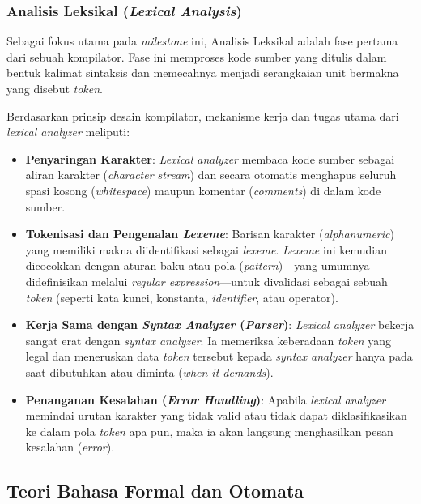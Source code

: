 \documentclass[12pt,a4paper]{article}
\begin{document}
\subsubsection{Analisis Leksikal (\textit{Lexical Analysis})}
Sebagai fokus utama pada \textit{milestone} ini, Analisis Leksikal adalah fase
pertama dari sebuah kompilator. Fase ini memproses kode sumber yang ditulis
dalam bentuk kalimat sintaksis dan memecahnya menjadi serangkaian unit bermakna
yang disebut \textit{token}. 

Berdasarkan prinsip desain kompilator, mekanisme kerja dan tugas utama dari
\textit{lexical analyzer} meliputi:
\begin{itemize}
    \item \textbf{Penyaringan Karakter}: \textit{Lexical analyzer} membaca kode
        sumber sebagai aliran karakter (\textit{character stream}) dan secara
        otomatis menghapus seluruh spasi kosong (\textit{whitespace}) maupun
        komentar (\textit{comments}) di dalam kode sumber.
    \item \textbf{Tokenisasi dan Pengenalan \textit{Lexeme}}: Barisan karakter
        (\textit{alphanumeric}) yang memiliki makna diidentifikasi sebagai
        \textit{lexeme}. \textit{Lexeme} ini kemudian dicocokkan dengan aturan
        baku atau pola (\textit{pattern})—yang umumnya didefinisikan melalui
        \textit{regular expression}—untuk divalidasi sebagai sebuah
        \textit{token} (seperti kata kunci, konstanta, \textit{identifier}, atau
        operator).
    \item \textbf{Kerja Sama dengan \textit{Syntax Analyzer} (\textit{Parser})}:
        \textit{Lexical analyzer} bekerja sangat erat dengan \textit{syntax
        analyzer}. Ia memeriksa keberadaan \textit{token} yang legal dan
        meneruskan data \textit{token} tersebut kepada \textit{syntax analyzer}
        hanya pada saat dibutuhkan atau diminta (\textit{when it demands}).
    \item \textbf{Penanganan Kesalahan (\textit{Error Handling})}: Apabila
        \textit{lexical analyzer} memindai urutan karakter yang tidak valid atau
        tidak dapat diklasifikasikan ke dalam pola \textit{token} apa pun, maka
        ia akan langsung menghasilkan pesan kesalahan (\textit{error}).
\end{itemize}

\subsection{Teori Bahasa Formal dan Otomata}
\end{document}
